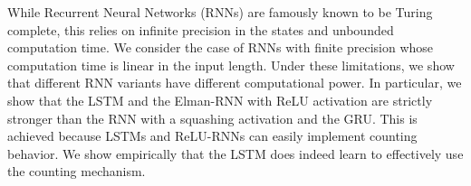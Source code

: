 While Recurrent Neural Networks (RNNs) are famously known to be Turing complete, this relies on infinite precision in the states and unbounded computation time. We consider the case of RNNs with finite precision whose computation time is linear in the input length. Under these limitations, we show that different RNN variants have different computational power. In particular, we show that the LSTM and the Elman-RNN with ReLU activation are strictly stronger than the RNN with a squashing activation and the GRU. This is achieved because LSTMs and ReLU-RNNs can easily implement counting behavior. We show empirically that the LSTM does indeed learn to effectively use the counting mechanism.
